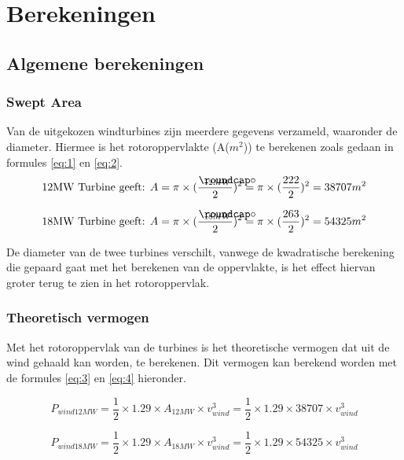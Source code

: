 
\section{Berekeningen}
\subsection{Algemene berekeningen}
\subsubsection{Swept Area}
Van de uitgekozen windturbines zijn meerdere gegevens verzameld, waaronder de diameter. Hiermee is het rotoroppervlakte (A(\(m^2\))) te berekenen zoals gedaan in formules \ref{eq:1} en \ref{eq:2}.
\begin{equation} \label{eq:1}
\text{12MW Turbine geeft: } A =\pi\times (\frac{\slashcirc_{12MW}}{2})^2 = \pi\times (\frac{222}{2})^2 = 38707 m^2
\end{equation}

\begin{equation} \label{eq:2}
\text{18MW Turbine geeft: } A =\pi\times (\frac{\slashcirc_{18MW}}{2})^2 = \pi\times (\frac{263}{2})^2 = 54325 m^2
\end{equation}

De diameter van de twee turbines verschilt, vanwege de kwadratische berekening die gepaard gaat met het berekenen van de oppervlakte, is het effect hiervan groter terug te zien in het rotoroppervlak.

\subsubsection{Theoretisch vermogen}
Met het rotoroppervlak van de turbines is het theoretische vermogen dat uit de wind gehaald kan worden, te berekenen. Dit vermogen kan berekend worden met de formules \ref{eq:3} en \ref{eq:4} hieronder. 

\begin{equation} \label{eq:3}
    P_{wind12MW} = \frac{1}{2}\times 1.29\times A_{12MW}\times v_{wind}^3 = \frac{1}{2}\times 1.29\times 38707\times v_{wind}^3
\end{equation}

\begin{equation} \label{eq:4}
    P_{wind18MW} = \frac{1}{2}\times 1.29\times A_{18MW}\times v_{wind}^3 = \frac{1}{2}\times 1.29\times 54325\times v_{wind}^3
\end{equation}

